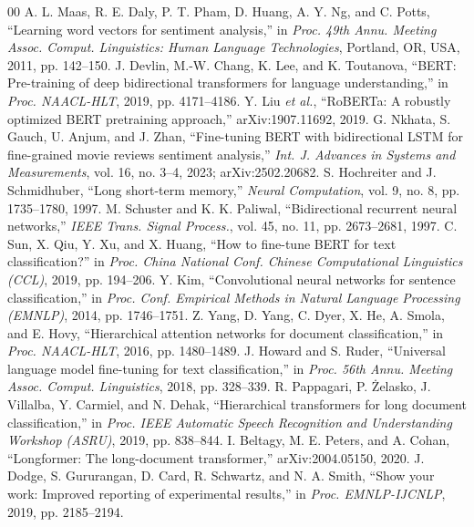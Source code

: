 \documentclass[conference]{IEEEtran}
\begin{document}
\begin{thebibliography}{00}
 A. L. Maas, R. E. Daly, P. T. Pham, D. Huang, A. Y. Ng, and C. Potts, ``Learning word vectors for sentiment analysis,'' in \textit{Proc. 49th Annu. Meeting Assoc. Comput. Linguistics: Human Language Technologies}, Portland, OR, USA, 2011, pp. 142--150.
 J. Devlin, M.-W. Chang, K. Lee, and K. Toutanova, ``BERT: Pre-training of deep bidirectional transformers for language understanding,'' in \textit{Proc. NAACL-HLT}, 2019, pp. 4171--4186.
 Y. Liu \textit{et al.}, ``RoBERTa: A robustly optimized BERT pretraining approach,'' arXiv:1907.11692, 2019.
 G. Nkhata, S. Gauch, U. Anjum, and J. Zhan, ``Fine-tuning BERT with bidirectional LSTM for fine-grained movie reviews sentiment analysis,'' \textit{Int. J. Advances in Systems and Measurements}, vol. 16, no. 3--4, 2023; arXiv:2502.20682.
 S. Hochreiter and J. Schmidhuber, ``Long short-term memory,'' \textit{Neural Computation}, vol. 9, no. 8, pp. 1735--1780, 1997.
 M. Schuster and K. K. Paliwal, ``Bidirectional recurrent neural networks,'' \textit{IEEE Trans. Signal Process.}, vol. 45, no. 11, pp. 2673--2681, 1997.
 C. Sun, X. Qiu, Y. Xu, and X. Huang, ``How to fine-tune BERT for text classification?'' in \textit{Proc. China National Conf. Chinese Computational Linguistics (CCL)}, 2019, pp. 194--206.
 Y. Kim, ``Convolutional neural networks for sentence classification,'' in \textit{Proc. Conf. Empirical Methods in Natural Language Processing (EMNLP)}, 2014, pp. 1746--1751.
 Z. Yang, D. Yang, C. Dyer, X. He, A. Smola, and E. Hovy, ``Hierarchical attention networks for document classification,'' in \textit{Proc. NAACL-HLT}, 2016, pp. 1480--1489.
 J. Howard and S. Ruder, ``Universal language model fine-tuning for text classification,'' in \textit{Proc. 56th Annu. Meeting Assoc. Comput. Linguistics}, 2018, pp. 328--339.
 R. Pappagari, P. Żelasko, J. Villalba, Y. Carmiel, and N. Dehak, ``Hierarchical transformers for long document classification,'' in \textit{Proc. IEEE Automatic Speech Recognition and Understanding Workshop (ASRU)}, 2019, pp. 838--844.
 I. Beltagy, M. E. Peters, and A. Cohan, ``Longformer: The long-document transformer,'' arXiv:2004.05150, 2020.
 J. Dodge, S. Gururangan, D. Card, R. Schwartz, and N. A. Smith, ``Show your work: Improved reporting of experimental results,'' in \textit{Proc. EMNLP-IJCNLP}, 2019, pp. 2185--2194.

\end{thebibliography}
\end{document}
